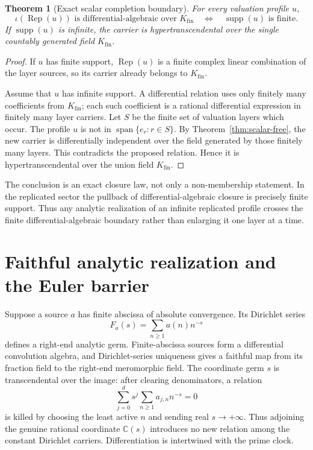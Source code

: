 \documentclass[11pt]{article}
\newtheorem{theorem}{Theorem}[section]
\theoremstyle{definition}
\theoremstyle{remark}
\newcommand{\C}{\mathbb C}
\newcommand{\supp}{\operatorname{supp}}
\begin{document}
\begin{theorem}[Exact scalar completion boundary]\label{thm:scalar-boundary}
For every valuation profile \(u\),
\begin{equation}\label{eq:scalar-boundary}
  \iota(\operatorname{Rep}(u))
  \text{ is differential-algebraic over }K_{\mathrm{fin}}
  \quad\Longleftrightarrow\quad
  \supp(u)\text{ is finite}.
\end{equation}
If \(\supp(u)\) is infinite, the carrier is hypertranscendental over the single countably
generated field \(K_{\mathrm{fin}}\).
\end{theorem}

\begin{proof}
If \(u\) has finite support, \(\operatorname{Rep}(u)\) is a finite complex linear combination
of the layer sources, so its carrier already belongs to \(K_{\mathrm{fin}}\).

Assume that \(u\) has infinite support.  A differential relation uses only finitely many
coefficients from \(K_{\mathrm{fin}}\); each such coefficient is a rational differential
expression in finitely many layer carriers.  Let \(S\) be the finite set of valuation layers
which occur.  The profile \(u\) is not in \(\operatorname{span}\{e_r:r\in S\}\).  By
Theorem~\ref{thm:scalar-free}, the new carrier is differentially independent over the field
generated by those finitely many layers.  This contradicts the proposed relation.  Hence it is
hypertranscendental over the union field \(K_{\mathrm{fin}}\).
\end{proof}

The conclusion is an exact closure law, not only a non-membership statement.  In the replicated
sector the pullback of differential-algebraic closure is precisely finite support.  Thus any
analytic realization of an infinite replicated profile crosses the finite differential-algebraic
boundary rather than enlarging it one layer at a time.

\section{Faithful analytic realization and the Euler barrier}\label{sec:euler}

Suppose a source \(a\) has finite abscissa of absolute convergence.  Its Dirichlet series
\[
  F_a(s)=\sum_{n\geq1}a(n)n^{-s}
\]
defines a right-end analytic germ.  Finite-abscissa sources form a differential convolution
algebra, and Dirichlet-series uniqueness gives a faithful map from its fraction field to the
right-end meromorphic field.  The coordinate germ \(s\) is transcendental over the image: after
clearing denominators, a relation
\[
  \sum_{j=0}^d s^j\sum_{n\geq1}a_{j,n}n^{-s}=0
\]
is killed by choosing the least active \(n\) and sending real \(s\to+\infty\).  Thus adjoining
the genuine rational coordinate \(\C(s)\) introduces no new relation among the constant
Dirichlet carriers.  Differentiation is intertwined with the prime clock.
\end{document}
